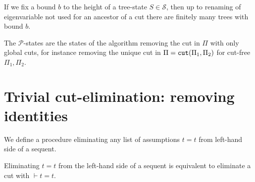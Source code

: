 \documentclass[a4paper,12pt]{article}
\newcommand{\setB}              { {\mathcal B} }
\newcommand{\setP}              { {\mathcal P} }
\newcommand{\setS}              { {\mathcal S} }
\newcommand{\cut}             { {\tt cut} }
\begin{document}


If we fix a bound $b$ to the height of a tree-state $S \in \setS$, then up to renaming of eigenvariable not used for an ancestor of a cut there are finitely many trees with bound $b$. 

The $\setP$-states are the states of the algorithm removing the cut in $\Pi$ with only global cuts, for instance removing the unique cut in $\Pi = \cut(\Pi_1, \Pi_2)$ for cut-free $\Pi_1, \Pi_2$.



\section{Trivial cut-elimination: removing identities}

We define a procedure eliminating any list of assumptions $t=t$ from left-hand side of a sequent. 


Eliminating $t=t$ from the left-hand side of a sequent is equivalent to  eliminate a cut with $\vdash t = t$. 
 
\end{document}
